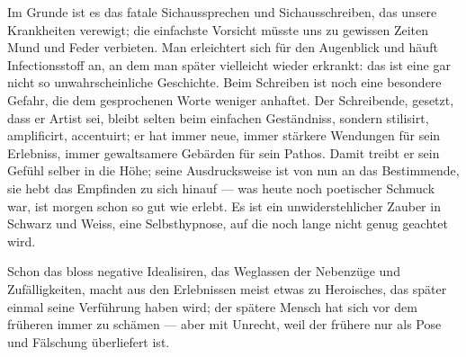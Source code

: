 Im Grunde ist es das fatale Sichaussprechen und Sichausschreiben, das unsere Krankheiten verewigt; die einfachste Vorsicht müsste uns zu gewissen Zeiten Mund und Feder verbieten. Man erleichtert sich für den Augenblick und häuft Infectionsstoff an, an dem man später vielleicht wieder erkrankt: das ist eine gar nicht so unwahrscheinliche Geschichte. Beim Schreiben ist noch eine besondere Gefahr, die dem gesprochenen Worte weniger anhaftet. Der Schreibende, gesetzt, dass er Artist sei, bleibt selten beim einfachen Geständniss, sondern stilisirt, amplificirt, accentuirt; er hat immer neue, immer stärkere Wendungen für sein Erlebniss, immer gewaltsamere Gebärden für sein Pathos. Damit treibt er sein Gefühl selber in die Höhe; seine Ausdrucksweise ist von nun an das Bestimmende, sie hebt das Empfinden zu sich hinauf — was heute noch poetischer Schmuck war, ist morgen schon so gut wie erlebt. Es ist ein unwiderstehlicher Zauber in Schwarz und Weiss, eine Selbsthypnose, auf die noch lange nicht genug geachtet wird.
\par

Schon das bloss negative Idealisiren, das Weglassen der Nebenzüge und Zufälligkeiten, macht aus den Erlebnissen meist etwas zu Heroisches, das später einmal seine Verführung haben wird; der spätere Mensch hat sich vor dem früheren immer zu schämen — aber mit Unrecht, weil der frühere nur als Pose und Fälschung überliefert ist.
\par

